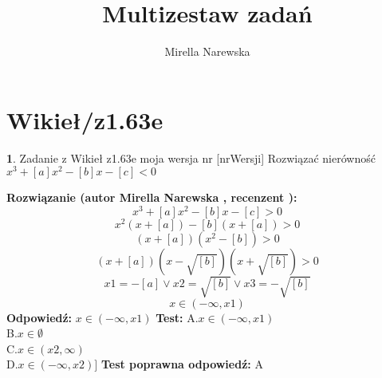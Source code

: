 \documentclass[12pt, a4paper]{article}
\title{Multizestaw zadań}
\author{Mirella Narewska}
\date{}
\theoremstyle{definition} %
\newtheorem{zad}{}
\newcommand{\kategoria}[1]{\section{#1}} %
\newcommand{\zadStart}[1]{\begin{zad}#1\newline} %
\newcommand{\zadStop}{\end{zad}}   %
\newcommand{\rozwStart}[2]{\noindent \textbf{Rozwiązanie (autor #1 , recenzent #2): }\newline} %
\newcommand{\rozwStop}{\newline}                                            %
\newcommand{\odpStart}{\noindent \textbf{Odpowiedź:}\newline}    %
\newcommand{\odpStop}{\newline}                                             %
\newcommand{\testStart}{\noindent \textbf{Test:}\newline} %
\newcommand{\testStop}{\newline} %
\newcommand{\kluczStart}{\noindent \textbf{Test poprawna odpowiedź:}\newline} %
\newcommand{\kluczStop}{\newline} %
\begin{document}
\maketitle


\kategoria{Wikieł/z1.63e}
\zadStart{Zadanie z Wikieł z1.63e moja wersja nr [nrWersji]}
Rozwiązać nierówność $x^3+[a]x^2-[b]x-[c]<0$
\zadStop
\rozwStart{Mirella Narewska}{}
$$x^3+[a]x^2-[b]x-[c]>0$$
$$x^2(x+[a])-[b](x+[a])>0$$
$$(x+[a])(x^2-[b])>0$$
$$(x+[a])(x-\sqrt{[b]})(x+\sqrt{[b]})>0$$
$$x1=-[a] \vee x2=\sqrt{[b]} \vee x3=-\sqrt{[b]}$$
$$x \in (-\infty,x1)$$
\rozwStop
\odpStart
$x \in (-\infty,x1)$
\odpStop
\testStart
A.$x \in (-\infty,x1)$
\\
B.$x \in \emptyset$
\\
C.$x \in (x2,\infty)$
\\
D.$x \in (-\infty,x2)]$
\testStop
\kluczStart
A
\kluczStop
\end{document}
